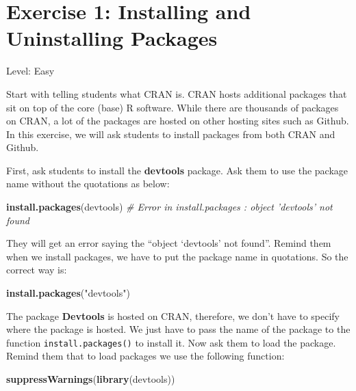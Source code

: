 \documentclass[]{book}
\newenvironment{Shaded}{\begin{snugshade}}{\end{snugshade}}
\newcommand{\CommentTok}[1]{\textcolor[rgb]{0.56,0.35,0.01}{\textit{#1}}}
\newcommand{\KeywordTok}[1]{\textcolor[rgb]{0.13,0.29,0.53}{\textbf{#1}}}
\newcommand{\NormalTok}[1]{#1}
\newcommand{\StringTok}[1]{\textcolor[rgb]{0.31,0.60,0.02}{#1}}
\begin{document}
\hypertarget{exercise-1-installing-and-uninstalling-packages}{%
\section*{Exercise 1: Installing and Uninstalling Packages}\label{exercise-1-installing-and-uninstalling-packages}}

Level: Easy

Start with telling students what CRAN is. CRAN hosts additional packages that sit on top of the core (base) R software. While there are thousands of packages on CRAN, a lot of the packages are hosted on other hosting sites such as Github. In this exercise, we will ask students to install packages from both CRAN and Github.

First, ask students to install the \textbf{devtools} package. Ask them to use the package name without the quotations as below:

\begin{Shaded}
\begin{Highlighting}[]
\KeywordTok{install.packages}\NormalTok{(devtools)}
\CommentTok{# Error in install.packages : object 'devtools' not found}
\end{Highlighting}
\end{Shaded}

They will get an error saying the ``object `devtools' not found''. Remind them when we install packages, we have to put the package name in quotations. So the correct way is:

\begin{Shaded}
\begin{Highlighting}[]
\KeywordTok{install.packages}\NormalTok{(}\StringTok{"devtools"}\NormalTok{)}
\end{Highlighting}
\end{Shaded}

The package \textbf{Devtools} is hosted on CRAN, therefore, we don't have to specify where the package is hosted. We just have to pass the name of the package to the function \texttt{install.packages()} to install it. Now ask them to load the package. Remind them that to load packages we use the following function:

\begin{Shaded}
\begin{Highlighting}[]
\KeywordTok{suppressWarnings}\NormalTok{(}\KeywordTok{library}\NormalTok{(devtools))}
\end{Highlighting}
\end{Shaded}
\end{document}
